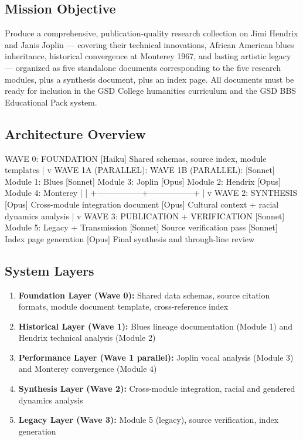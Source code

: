 \documentclass[11pt,letterpaper]{article}
\begin{document}
\subsection{Mission Objective}

Produce a comprehensive, publication-quality research collection on Jimi Hendrix and Janis Joplin --- covering their technical innovations, African American blues inheritance, historical convergence at Monterey 1967, and lasting artistic legacy --- organized as five standalone documents corresponding to the five research modules, plus a synthesis document, plus an index page. All documents must be ready for inclusion in the GSD College humanities curriculum and the GSD BBS Educational Pack system.

\subsection{Architecture Overview}

\begin{asciibox}
WAVE 0: FOUNDATION
  [Haiku] Shared schemas, source index, module templates
         |
         v
WAVE 1A (PARALLEL):                WAVE 1B (PARALLEL):
  [Sonnet] Module 1: Blues          [Sonnet] Module 3: Joplin
  [Opus]   Module 2: Hendrix        [Opus]   Module 4: Monterey
         |                                   |
         +-----------------+-----------------+
                           |
                           v
WAVE 2: SYNTHESIS
  [Opus] Cross-module integration document
  [Opus] Cultural context + racial dynamics analysis
         |
         v
WAVE 3: PUBLICATION + VERIFICATION
  [Sonnet] Module 5: Legacy + Transmission
  [Sonnet] Source verification pass
  [Sonnet] Index page generation
  [Opus]   Final synthesis and through-line review
\end{asciibox}

\subsection{System Layers}

\begin{enumerate}[leftmargin=*]
  \item \textbf{Foundation Layer (Wave 0):} Shared data schemas, source citation formats, module document template, cross-reference index
  \item \textbf{Historical Layer (Wave 1):} Blues lineage documentation (Module 1) and Hendrix technical analysis (Module 2)
  \item \textbf{Performance Layer (Wave 1 parallel):} Joplin vocal analysis (Module 3) and Monterey convergence (Module 4)
  \item \textbf{Synthesis Layer (Wave 2):} Cross-module integration, racial and gendered dynamics analysis
  \item \textbf{Legacy Layer (Wave 3):} Module 5 (legacy), source verification, index generation
\end{enumerate}
\end{document}
